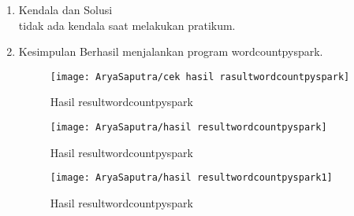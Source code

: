 \clearpage
{}
\begin{enumerate}
\item Kendala dan Solusi \\
tidak ada kendala saat melakukan pratikum.

\item Kesimpulan
\newline Berhasil menjalankan program wordcountpyspark.

\begin{figure}[!ht]
\texttt{[image: AryaSaputra/cek hasil rasultwordcountpyspark]}
\caption{Hasil resultwordcountpyspark}
\label{gam:resultwordcountpyspark}
\end{figure}

\vspace*{-1cm}
\begin{figure}[!ht]
\texttt{[image: AryaSaputra/hasil resultwordcountpyspark]}
\caption{Hasil resultwordcountpyspark}
\label{gam:resultwordcountpyspark}
\end{figure}

\vspace*{-.5cm}
\begin{figure}[!ht]
\texttt{[image: AryaSaputra/hasil resultwordcountpyspark1]}
\caption{Hasil resultwordcountpyspark}
\label{gam:resultwordcountpyspark}
\end{figure}
\end{enumerate}
